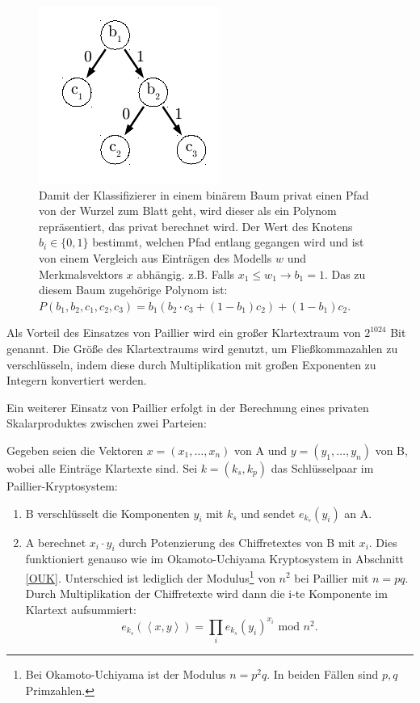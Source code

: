 \begin{figure}[h] 
	\begin{center}
		\includegraphics{fig/Baum}
		\caption{Damit der Klassifizierer in einem binärem Baum privat einen Pfad von der Wurzel zum Blatt geht, wird dieser als ein Polynom repräsentiert, das privat berechnet wird. Der Wert des Knotens $b_i\in\{0,1\}$ bestimmt, welchen Pfad entlang gegangen wird und ist von einem Vergleich aus Einträgen des Modells $w$ und Merkmalsvektors $x$ abhängig. z.B. Falls $x_1\leq w_1 \rightarrow b_1=1$. Das zu diesem Baum zugehörige Polynom ist: $P(b_1,b_2,c_1,c_2,c_3)=b_1(b_2\cdot c_3+(1-b_1)c_2)+(1-b_1)c_2$.}
		\label{fig:Baum}
	\end{center}
\end{figure}

Als Vorteil des Einsatzes von Paillier wird ein großer Klartextraum von $2^{1024}$ Bit genannt. Die Größe des Klartextraums wird genutzt, um Fließkommazahlen zu verschlüsseln, indem diese durch Multiplikation mit großen Exponenten zu Integern konvertiert werden.

Ein weiterer Einsatz von Paillier erfolgt in der Berechnung eines privaten Skalarproduktes zwischen zwei Parteien:

Gegeben seien die Vektoren $x=(x_1,\ldots,x_n)$ von A und $y=(y_1,\ldots,y_n)$ von B, wobei alle Einträge Klartexte sind. Sei $k=(k_s,k_p)$ das Schlüsselpaar im Paillier-Kryptosystem:

\begin{enumerate}
	\item B verschlüsselt die Komponenten $y_i$ mit $k_s$ und sendet $e_{k_s}(y_i)$ an A.
	\item A berechnet $x_i\cdot y_i$ durch Potenzierung des Chiffretextes von B mit $x_i$. Dies funktioniert genauso wie im Okamoto-Uchiyama Kryptosystem in Abschnitt \ref{OUK}. Unterschied ist lediglich der Modulus\footnote{Bei Okamoto-Uchiyama ist der Modulus $n=p^2 q$. In beiden Fällen sind $p,q$ Primzahlen.}  von $n^2$  bei Paillier mit $n=pq$. Durch Multiplikation der Chiffretexte wird dann die i-te Komponente im Klartext aufsummiert:	
	\begin{equation*}
		e_{k_s}(\left\langle x,y\right\rangle )=\prod_i e_{k_s}(y_i)^{x_i} \text{ mod } n^2.
	\end{equation*}
\end{enumerate}

